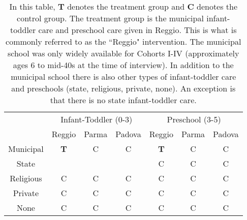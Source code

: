 %
%
%

\begin{table}
\begin{center}
\begin{tabular}{ccccccc}
\toprule
& \multicolumn{3}{c}{Infant-Toddler (0-3)} & \multicolumn{3}{c}{Preschool (3-5)} \\
& Reggio & Parma & Padova & Reggio & Parma & Padova \\
\midrule
Municipal 	& \textbf{T} & \cellcolor{black!20}C & \cellcolor{black!20}C & \textbf{T} & \cellcolor{black!20}C & \cellcolor{black!20}C \\
State 	& 	&  & & \cellcolor{black!20}C & \cellcolor{black!20}C & \cellcolor{black!20}C \\
Religious 	& \cellcolor{black!20}C & \cellcolor{black!20}C & \cellcolor{black!20}C & \cellcolor{black!20}C & \cellcolor{black!20}C & \cellcolor{black!20}C \\
Private 	& \cellcolor{black!20}C & \cellcolor{black!20}C & \cellcolor{black!20}C & \cellcolor{black!20}C & \cellcolor{black!20}C & \cellcolor{black!20}C \\
None 	& \cellcolor{black!20}C & \cellcolor{black!20}C & \cellcolor{black!20}C & \cellcolor{black!20}C & \cellcolor{black!20}C & \cellcolor{black!20}C \\
\bottomrule
\end{tabular}
\caption{In this table, \textbf{T} denotes the treatment group and \textbf{C} denotes the control group. The treatment group is the municipal infant-toddler care and preschool care given in Reggio. This is what is commonly referred to as the ``Reggio" intervention. The municipal school was only widely available for Cohorts I-IV (approximately ages 6 to mid-40s at the time of interview). In addition to the municipal school there is also other types of infant-toddler care and preschools (state, religious, private, none). An exception is that there is no state infant-toddler care.}
\end{center}
\end{table}

%
